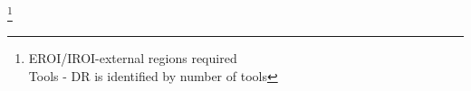 \documentclass{beamer}
\begin{document}
\begin{frame}
\footnote{EROI/IROI-external regions required\\
Tools - DR is identified by number of tools}
\end{frame}

\begin{frame}
\end{frame}
\end{document}
